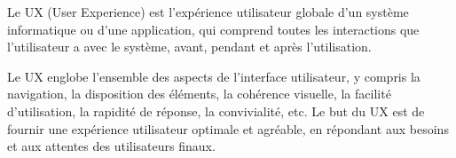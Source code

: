 
Le UX (User Experience) est l'expérience utilisateur globale d'un système informatique ou d'une application, qui comprend toutes les interactions que l'utilisateur a avec le système, avant, pendant et après l'utilisation.

Le UX englobe l'ensemble des aspects de l'interface utilisateur, y compris la navigation, la disposition des éléments, la cohérence visuelle, la facilité d'utilisation, la rapidité de réponse, la convivialité, etc. Le but du UX est de fournir une expérience utilisateur optimale et agréable, en répondant aux besoins et aux attentes des utilisateurs finaux.

